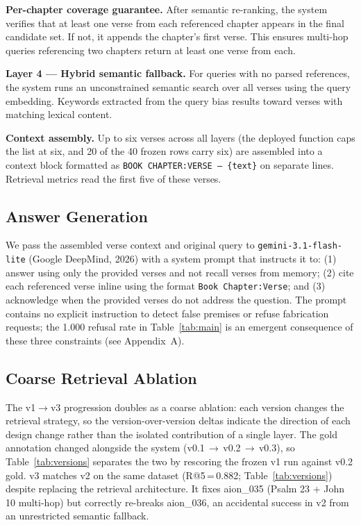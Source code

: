 \documentclass[11pt]{article}
\begin{document}
\textbf{Per-chapter coverage guarantee.} After semantic re-ranking, the system verifies that at least one verse from each referenced chapter appears in the final candidate set. If not, it appends the chapter's first verse. This ensures multi-hop queries referencing two chapters return at least one verse from each.

\textbf{Layer 4 --- Hybrid semantic fallback.} For queries with no parsed references, the system runs an unconstrained semantic search over all verses using the query embedding. Keywords extracted from the query bias results toward verses with matching lexical content.

\textbf{Context assembly.} Up to six verses across all layers (the deployed function caps the list at six, and 20 of the 40 frozen rows carry six) are assembled into a context block formatted as \texttt{BOOK CHAPTER:VERSE --- \{text\}} on separate lines. Retrieval metrics read the first five of these verses.

\subsection{Answer Generation}

We pass the assembled verse context and original query to \texttt{gemini-3.1-flash-lite} (Google DeepMind, 2026) with a system prompt that instructs it to: (1) answer using only the provided verses and not recall verses from memory; (2) cite each referenced verse inline using the format \texttt{Book Chapter:Verse}; and (3) acknowledge when the provided verses do not address the question. The prompt contains no explicit instruction to detect false premises or refuse fabrication requests; the 1.000 refusal rate in Table~\ref{tab:main} is an emergent consequence of these three constraints (see Appendix~A).

\subsection{Coarse Retrieval Ablation}

The v1$\rightarrow$v3 progression doubles as a coarse ablation: each version changes the retrieval strategy, so the version-over-version deltas indicate the direction of each design change rather than the isolated contribution of a single layer.
The gold annotation changed alongside the system (v0.1\,$\rightarrow$\,v0.2\,$\rightarrow$\,v0.3), so Table~\ref{tab:versions} separates the two by rescoring the frozen v1 run against v0.2 gold.
v3 matches v2 on the same dataset (R@5\,=\,0.882; Table~\ref{tab:versions}) despite replacing the retrieval architecture.
It fixes aion\_035 (Psalm 23 + John 10 multi-hop) but correctly re-breaks aion\_036, an accidental success in v2 from an unrestricted semantic fallback.
\end{document}

